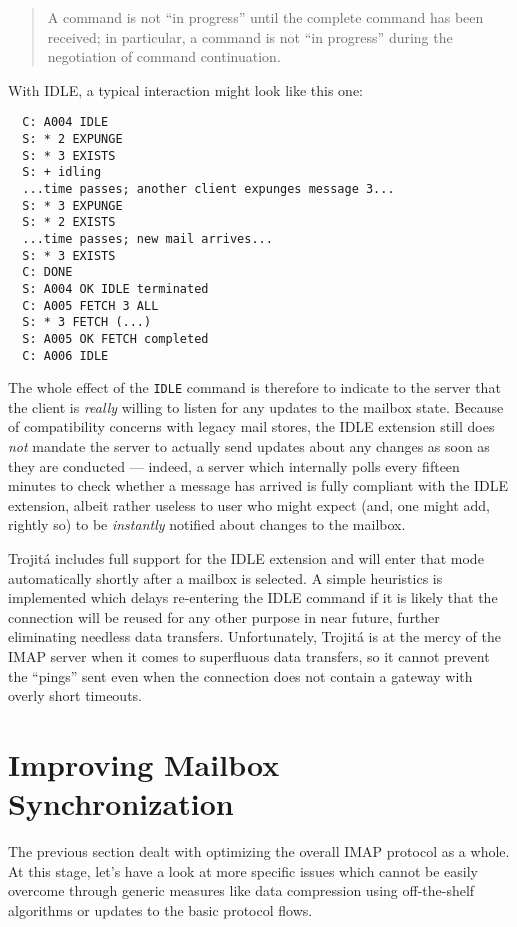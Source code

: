 \documentclass[trojita]{subfiles}
\begin{document}
\begin{quote}
  A command is not ``in progress'' until the complete command has been received; in particular, a command is not ``in
  progress'' during the negotiation of command continuation.
\end{quote}

With IDLE, a typical interaction might look like this one:

\begin{verbatim}
  C: A004 IDLE
  S: * 2 EXPUNGE
  S: * 3 EXISTS
  S: + idling
  ...time passes; another client expunges message 3...
  S: * 3 EXPUNGE
  S: * 2 EXISTS
  ...time passes; new mail arrives...
  S: * 3 EXISTS
  C: DONE
  S: A004 OK IDLE terminated
  C: A005 FETCH 3 ALL
  S: * 3 FETCH (...)
  S: A005 OK FETCH completed
  C: A006 IDLE
\end{verbatim}

The whole effect of the {\tt IDLE} command is therefore to indicate to the server that the client is {\em really}
willing to listen for any updates to the mailbox state.  Because of compatibility concerns with legacy mail stores, the
IDLE extension still does {\em not} mandate the server to actually send updates about any changes as soon as they are
conducted --- indeed, a server which internally polls every fifteen minutes to check whether a message has arrived is
fully compliant with the IDLE extension, albeit rather useless to user who might expect (and, one might add, rightly so)
to be {\em instantly} notified about changes to the mailbox.

Trojitá includes full support for the IDLE extension and will enter that mode automatically shortly after a mailbox is
selected.  A simple heuristics is implemented which delays re-entering the IDLE command if it is likely that the
connection will be reused for any other purpose in near future, further eliminating needless data transfers.
Unfortunately, Trojitá is at the mercy of the IMAP server when it comes to superfluous data transfers, so it cannot
prevent the ``pings'' sent even when the connection does not contain a gateway with overly short timeouts.

\section{Improving Mailbox Synchronization}

The previous section dealt with optimizing the overall IMAP protocol as a whole.  At this stage, let's have a look at
more specific issues which cannot be easily overcome through generic measures like data compression using off-the-shelf
algorithms or updates to the basic protocol flows.
\end{document}
